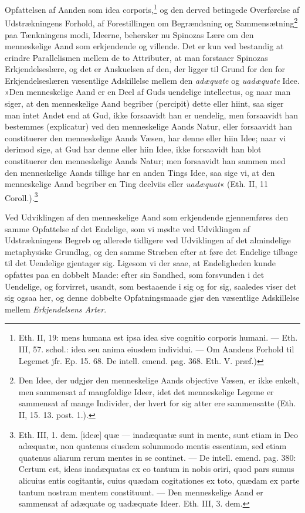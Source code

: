 \documentclass[12pt,a4paper]{book}
\newcommand{\opage}[1]{\marginnote{\footnotesize\textit{[#1]}}}
\begin{document}
\opage{87} \setcounter{footnote}{0}%
Opfattelsen af Aanden som idea corporis,\footnote{Eth. II, 19:
mens humana est ipsa idea sive cognitio corporis humani. ---
Eth. III, 57. schol.: idea seu anima eiusdem individui. --- Om
Aandens Forhold til Legemet jfr. Ep. 15. 68. De intell. emend.
pag. 368. Eth. V. præf.)} og den derved betingede Overførelse
af Udstrækningens Forhold, af Forestillingen om Begrændsning
og Sammensætning\footnote{Den Idee, der udgjør den
menneskelige Aands objective Væsen, er ikke enkelt, men
sammensat af mangfoldige Ideer, idet det menneskelige Legeme
er sammensat af mange Individer, der hvert for sig atter ere
sammensatte (Eth. II, 15. 13. post. 1.).} paa Tænkningens
modi, Ideerne, behersker nu Spinozas Lære om den menneskelige
Aand som erkjendende og villende. Det er kun ved bestandig at
erindre Parallelismen mellem de to Attributer, at man forstaaer
Spinozas Erkjendelseslære, og det er Anskuelsen af den, der
ligger til Grund for den for Erkjendelseslæren væsentlige
Adskillelse mellem den \emph{adæquate} og \emph{uadæquate} Idee.
»Den menneskelige Aand er en Deel af Guds uendelige
intellectus, og naar man siger, at den menneskelige Aand
begriber (percipit) dette eller hiint, saa siger man intet
Andet end at Gud, ikke forsaavidt han er uendelig, men
forsaavidt han bestemmes (explicatur) ved den menneskelige
Aands Natur, eller forsaavidt han constituerer den
menneskelige Aands Væsen, har denne eller hiin Idee; naar vi
derimod sige, at Gud har denne eller hiin Idee, ikke forsaavidt
han blot constituerer den menneskelige Aands Natur; men
forsaavidt han sammen med den menneskelige Aands tillige har
en anden Tings Idee, saa sige vi, at den menneskelige Aand
begriber en Ting deelviis eller \emph{uadæquat}« (Eth. II, 11
Coroll.).\footnote{Eth. III, 1. dem. [ideæ] quæ --- inadæquatæ
sunt in mente, sunt etiam in Deo adæquatæ, non quatenus
eiusdem solummodo mentis essentiam, sed etiam quatenus
aliarum rerum mentes in se continet. --- De intell. emend.
pag. 380: Certum est, ideas inadæquatas ex eo tantum in nobis
oriri, quod pars sumus alicuius entis cogitantis, cuius
quædam cogitationes ex toto, quædam ex parte tantum nostram
mentem constituunt. --- Den menneskelige Aand er sammensat af
adæquate og uadæquate Ideer. Eth. III, 3. dem.}

\opage{88} \setcounter{footnote}{0}%
Ved Udviklingen af den menneskelige Aand som erkjendende
gjennemføres den samme Opfattelse af det Endelige, som vi
mødte ved Udviklingen af Udstrækningens Begreb og allerede
tidligere ved Udviklingen af det almindelige metaphysiske
Grundlag, og den samme Stræben efter at føre det Endelige
tilbage til det Uendelige gjentager sig. Ligesom vi der saae,
at Endeligheden kunde opfattes paa en dobbelt Maade: efter sin
Sandhed, som forsvunden i det Uendelige, og forvirret, usandt,
som bestaaende i sig og for sig, saaledes viser det sig ogsaa
her, og denne dobbelte Opfatningsmaade gjør den væsentlige
Adskillelse mellem \emph{Erkjendelsens Arter}.
\end{document}
